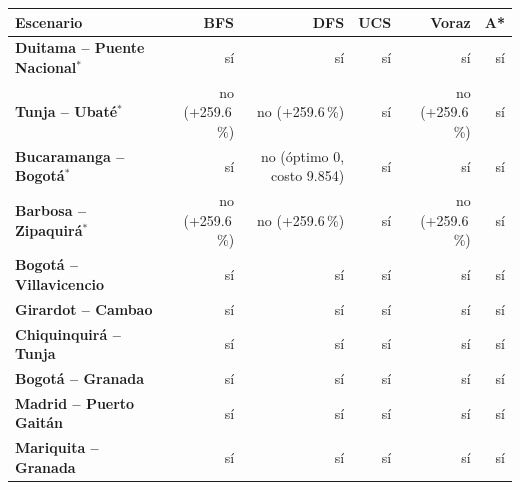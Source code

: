 \renewcommand{\arraystretch}{1.2}
\begin{tabular}{|l|r|r|r|r|r|}
\hline
\rowcolor{gray!20} \textbf{Escenario} & \textbf{BFS} & \textbf{DFS} & \textbf{UCS} & \textbf{Voraz} & \textbf{A*} \\
\hline
\textbf{Duitama -- Puente Nacional$^{*}$} & sí & sí & sí & sí & sí \\
\hline
\textbf{Tunja -- Ubaté$^{*}$} & no (+259.6\,\%) & no (+259.6\,\%) & sí & no (+259.6\,\%) & sí \\
\hline
\textbf{Bucaramanga -- Bogotá$^{*}$} & sí & no (óptimo $0$, costo 9.854) & sí & sí & sí \\
\hline
\textbf{Barbosa -- Zipaquirá$^{*}$} & no (+259.6\,\%) & no (+259.6\,\%) & sí & no (+259.6\,\%) & sí \\
\hline
\textbf{Bogotá -- Villavicencio} & sí & sí & sí & sí & sí \\
\hline
\textbf{Girardot -- Cambao} & sí & sí & sí & sí & sí \\
\hline
\textbf{Chiquinquirá -- Tunja} & sí & sí & sí & sí & sí \\
\hline
\textbf{Bogotá -- Granada} & sí & sí & sí & sí & sí \\
\hline
\textbf{Madrid -- Puerto Gaitán} & sí & sí & sí & sí & sí \\
\hline
\textbf{Mariquita -- Granada} & sí & sí & sí & sí & sí \\
\hline
\end{tabular}
